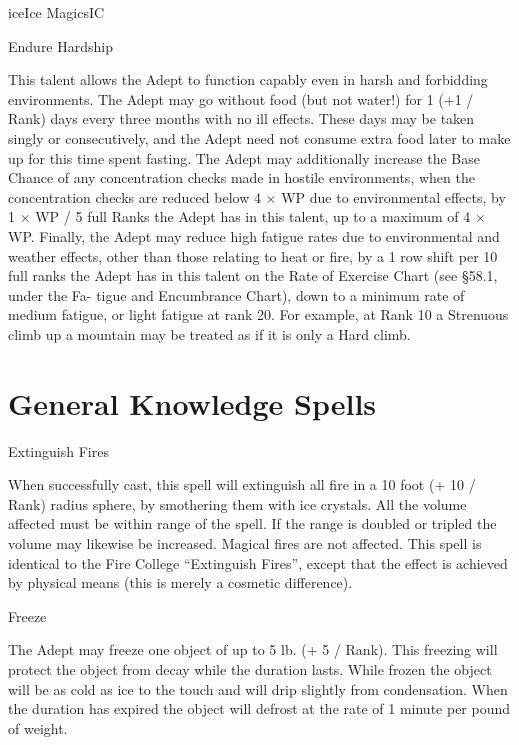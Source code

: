 \begin{College}[1.5]{ice}{Ice Magics}{IC}
\begin{talent}[T-2]{Endure Hardship}
\begin{effects}
This talent allows the Adept to function capably even in harsh and
forbidding environments.  The Adept may go without food (but not
water!) for 1 (+1 / Rank) days every three months with no ill
effects. These days may be taken singly or consecutively, and the
Adept need not consume extra food later to make up for this time spent
fasting.  The Adept may additionally increase the Base Chance of any
concentration checks made in hostile environments, when the
concentration checks are reduced below 4 × WP due to environmental
effects, by 1 × WP / 5 full Ranks the Adept has in this talent, up to
a maximum of 4 × WP.  Finally, the Adept may reduce high fatigue rates
due to environmental and weather effects, other than those relating to
heat or fire, by a 1 row shift per 10 full ranks the Adept has in this
talent on the Rate of Exercise Chart (see §58.1, under the Fa- tigue
and Encumbrance Chart), down to a minimum rate of medium fatigue, or
light fatigue at rank 20.  For example, at Rank 10 a Strenuous climb
up a mountain may be treated as if it is only a Hard climb.
\end{effects}
\end{talent}

\section{General Knowledge Spells}

\begin{spell}[G-1]{Extinguish Fires}

\begin{effects}
When successfully cast, this spell will extinguish all fire in a 10
foot (+ 10 / Rank) radius sphere, by smothering them with ice
crystals.  All the volume affected must be within range of the
spell. If the range is doubled or tripled the volume may likewise be
increased.  Magical fires are not affected.  This spell is identical
to the Fire College “Extinguish Fires”, except that the effect is
achieved by physical means (this is merely a cosmetic difference).
\end{effects}
\end{spell}

\begin{spell}[G-2]{Freeze}
\begin{effects}
The Adept may freeze one object of up to 5 lb.  (+ 5 / Rank).  This
freezing will protect the object from decay while the duration lasts.
While frozen the object will be as cold as ice to the touch and will
drip slightly from condensation. When the duration has expired the
object will defrost at the rate of 1 minute per pound of weight.
\end{effects}
\end{spell}


\end{College}
